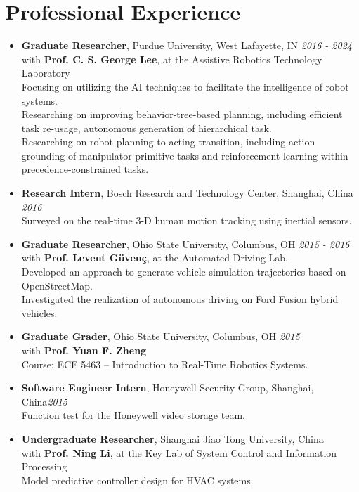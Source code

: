 \documentclass[12pt]{article}
\begin{document}
\vspace*{0.3cm}
\section*{Professional Experience}
\begin{itemize}[leftmargin=1.5em]
\item[] {\bf Graduate Researcher}, Purdue University, West Lafayette, IN \hfill {\em 2016 - 2024}\\
with {\bf Prof. C. S. George Lee}, at the Assistive Robotics Technology Laboratory\\
Focusing on utilizing the AI techniques to facilitate the intelligence of robot systems.\\
Researching on improving behavior-tree-based planning, including efficient task re-usage, autonomous generation of hierarchical task.\\
Researching on robot planning-to-acting transition, including action grounding of manipulator
primitive tasks and reinforcement learning within precedence-constrained tasks.
\item[] {\bf Research Intern}, Bosch Research and Technology Center, Shanghai, China \hfill {\em 2016}\\Surveyed on the real-time 3-D human motion tracking using inertial sensors.
\item[] {\bf Graduate Researcher}, Ohio State University, Columbus, OH \hfill {\em 2015 - 2016}\\
with {\bf Prof. Levent Güvenç}, at the Automated Driving Lab.\\
Developed an approach to generate vehicle simulation trajectories based on OpenStreetMap.\\
Investigated the realization of autonomous driving on Ford Fusion hybrid vehicles.
\item[] {\bf Graduate Grader}, Ohio State University, Columbus, OH \hfill {\em 2015}\\
with {\bf Prof. Yuan F. Zheng}\\ Course: ECE 5463 -- Introduction to Real-Time Robotics Systems.
\item[]  {\bf Software Engineer Intern}, Honeywell Security Group, Shanghai, China\hfill {\em 2015}\\
Function test for the Honeywell video storage team.
\item[] {\bf Undergraduate Researcher}, Shanghai Jiao Tong University, China\\
with {\bf Prof. Ning Li}, at the Key Lab of System Control and Information Processing\\
Model predictive controller design for HVAC systems.
\end{itemize}
\end{document}
